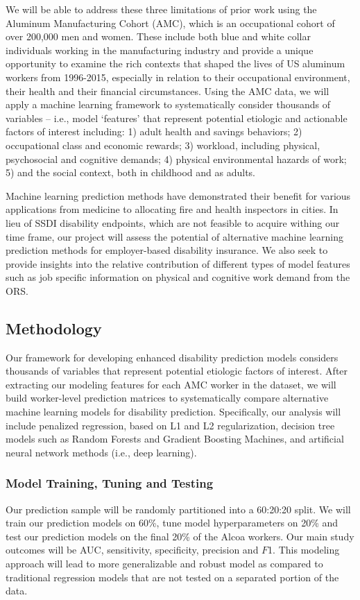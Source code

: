 \documentclass[letter]{article}
\begin{document}
We will be able to address these three limitations of prior work using the Aluminum Manufacturing Cohort (AMC), which is an occupational cohort of over 200,000 men and women. These include both blue and white collar individuals working in the manufacturing industry and provide a unique opportunity to examine the rich contexts that shaped the lives of US aluminum workers from 1996-2015, especially in relation to their occupational environment, their health and their financial circumstances. Using the AMC data, we will apply a machine learning framework to systematically consider thousands of variables -- i.e., model `features' that represent potential etiologic and actionable factors of interest including: 1) adult health and savings behaviors; 2) occupational class and economic rewards; 3) workload, including physical, psychosocial and cognitive demands; 4) physical environmental hazards of work; 5) and the social context, both in childhood and as adults. 

Machine learning prediction methods have demonstrated their benefit for various applications from medicine to allocating fire and health inspectors in cities\cite{Athey2017}. In lieu of SSDI disability endpoints, which are not feasible to acquire withing our time frame, our project will assess the potential of alternative machine learning prediction methods for employer-based disability insurance.  We also seek to provide insights into the relative contribution of different types of model features such as job specific information on physical and cognitive work demand from the ORS.  

\subsection{Methodology}
Our framework for developing enhanced disability prediction models considers thousands of variables that represent potential etiologic factors of interest. After extracting our modeling features for each AMC worker in the dataset, we will build worker-level prediction matrices to systematically compare alternative machine learning models for disability prediction.  Specifically, our analysis will include penalized regression, based on L1 and L2 regularization\cite{Ng2004,hastie2007}, decision tree models such as Random Forests and Gradient Boosting Machines\cite{freund96,friedman2000,Breiman01}, and  artificial neural network\cite{Bengio2009,pytorch,Goodfellow2016} methods (i.e., deep learning). 

\subsubsection{Model Training, Tuning and Testing}
Our prediction sample will be randomly partitioned into a 60:20:20 split.  We will train our prediction models on 60\%, tune model hyperparameters on 20\% and test our prediction models on the final 20\% of the Alcoa workers.  Our main study outcomes will be AUC, sensitivity, specificity, precision and $F$1. This modeling approach will lead to more generalizable and robust model as compared to traditional regression models that are not tested on a separated portion of the data.
\end{document}

